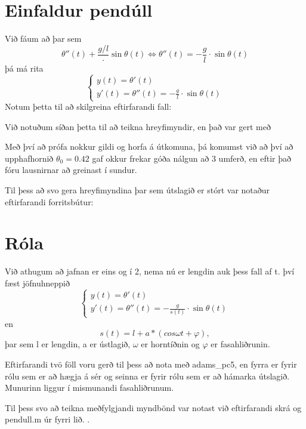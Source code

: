 \documentclass[a4]{article}
\begin{document}
\section{Einfaldur pendúll}
Við fáum að þar sem $$\theta''(t) + \frac{g/l} \cdot \sin{ \theta(t)} \Leftrightarrow \theta''(t) = -\frac{g}{l} \cdot \sin{\theta(t)}$$
  þá má rita $$\left\{ \begin{array}{l} y(t) = \theta'(t) \\ y'(t) = \theta''(t) = - \frac{g}{l} \cdot \sin{\theta(t)} \end{array} \right.$$
Notum þetta til að skilgreina eftirfarandi fall:



Við notuðum síðan þetta til að teikna hreyfimyndir, en það var gert með


Með því að prófa nokkur gildi og horfa á útkomuna, þá komumst við að því að upphafhornið
$\theta_0 = 0.42$ gaf okkur frekar góða nálgun að 3 umferð, en eftir það fóru lausnirnar að greinast í sundur.

Til þess að svo gera hreyfimyndina þar sem útslagið er stórt var notaður eftirfarandi forritsbútur:


\section{Róla}
  Við athugum að jafnan er eins og í 2, nema nú er lengdin auk þess fall af t. því fæst jöfnuhneppið
  $$\left\{ \begin{array}{l} y(t) = \theta'(t) \\ y'(t) = \theta''(t) = - \frac{g}{s(t)} \cdot \sin{\theta(t)} \end{array} \right.$$ 
  en $$s(t) = l + a*(cos \omega t + \varphi),$$
  þar sem l er lengdin, a er ústlagið, $\omega$ er horntíðnin og $\varphi$ er fasahliðrunin.
  
  Eftirfarandi tvö föll voru gerð til þess að nota með adams\_pc5, en fyrra er fyrir rólu sem er að hægja á sér og seinna er fyrir rólu sem er að hámarka útslagið. Munurinn liggur í mismunandi fasahliðrunum.
  
  

  Til þess svo að teikna meðfylgjandi myndbönd var notast við eftirfarandi skrá og pendull.m úr fyrri lið.
  .
  
\end{document}
